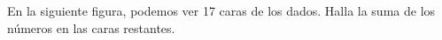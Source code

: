 En la siguiente figura, podemos ver 17 caras de los dados. Halla la suma de los números en las caras restantes.